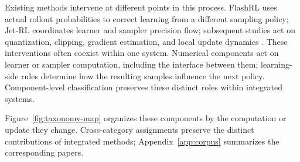 Existing methods intervene at different points in this process. FlashRL uses actual rollout probabilities to correct learning from a different sampling policy; Jet-RL coordinates learner and sampler precision flow; subsequent studies act on quantization, clipping, gradient estimation, and local update dynamics \citep{flashrl,jet}. These interventions often coexist within one system. Numerical components act on learner or sampler computation, including the interface between them; learning-side rules determine how the resulting samples influence the next policy. Component-level classification preserves these distinct roles within integrated systems.


Figure~\ref{fig:taxonomy-map} organizes these components by the computation or update they change. Cross-category assignments preserve the distinct contributions of integrated methods; Appendix~\ref{app:corpus} summarizes the corresponding papers.

